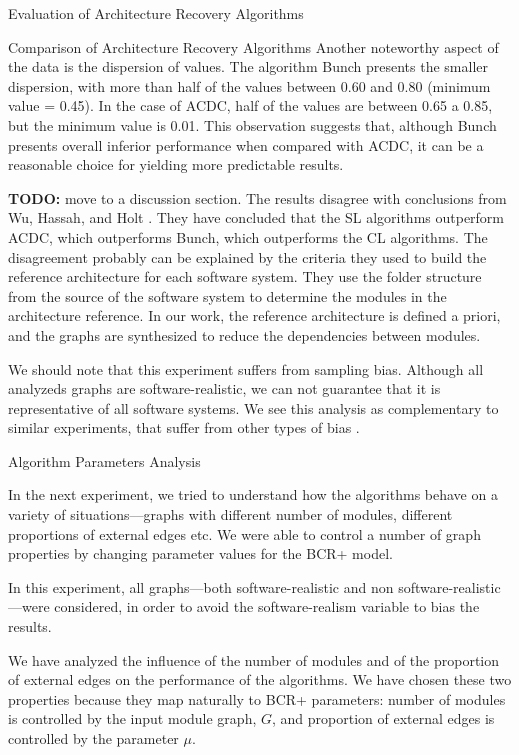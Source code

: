 \documentclass[11pt,twocolumn,a4paper,english]{article}
\newcommand{\TODO}{\textbf{TODO:} }
\begin{document}
\begin{section}{Evaluation of Architecture Recovery Algorithms}
\begin{subsection}{Comparison of Architecture Recovery Algorithms}
	Another noteworthy aspect of the data is the dispersion of values. The algorithm Bunch presents the smaller dispersion, with more than half of the values between 0.60 and 0.80 (minimum value = 0.45). In the case of ACDC, half of the values are between 0.65 a 0.85, but the minimum value is 0.01. This observation suggests that, although Bunch presents overall inferior performance when compared with ACDC, it can be a reasonable choice for yielding more predictable results.
	
	\TODO move to a discussion section.
	The results disagree with conclusions from Wu, Hassah, and Holt \cite{Wu2005}. They have concluded that the SL algorithms outperform ACDC, which outperforms Bunch, which outperforms the CL algorithms. The disagreement probably can be explained by the criteria they used to build the reference architecture for each software system. They use the folder structure from the source of the software system to determine the modules in the architecture reference. In our work, the reference architecture is defined a priori, and the graphs are synthesized to reduce the dependencies between modules.
	
	We should note that this experiment suffers from sampling bias. Although all analyzeds graphs are software-realistic, we can not guarantee that it is representative of all software systems. We see this analysis as complementary to similar experiments, that suffer from other types of bias \cite{Wu2005,Bittencourt2009,Andritsos2005}.
	
\end{subsection}	

\begin{subsection}{Algorithm Parameters Analysis}
	
	In the next experiment, we tried to understand how the algorithms behave on a variety of situations---graphs with different number of modules, different proportions of external edges etc. We were able to control a number of graph properties by changing parameter values for the BCR+ model.
	
	In this experiment, all graphs---both software-realistic and non software-realistic---were considered, in order to avoid the software-realism variable to bias the results.
	
	We have analyzed the influence of the number of modules and of the proportion of external edges on the performance of the algorithms. We have chosen these two properties because they map naturally to BCR+ parameters: number of modules is controlled by the input module graph, $G$, and proportion of external edges is controlled by the parameter $\mu$.


\end{subsection}
\end{section}
\end{document}
